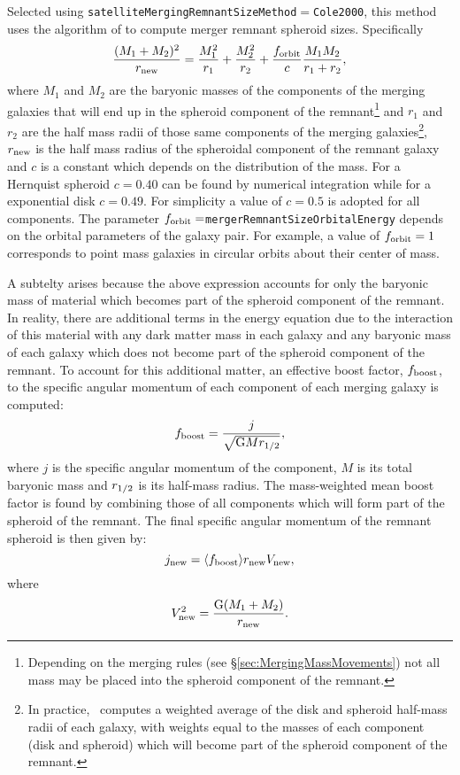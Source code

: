 Selected using {\tt satelliteMergingRemnantSizeMethod}$=${\tt Cole2000}, this method uses the algorithm of \cite{cole_hierarchical_2000} to compute merger remnant spheroid sizes. Specifically
\begin{equation}
\frac{(M_1+M_2)^2}{ r_{\rm new}} =
\frac{M_1^2}{r_1} + \frac{M_2^2}{r_2} + \frac{ f_{\rm orbit}}{c}
\frac{M_1 M_2}{r_1+r_2},
\end{equation}
where $M_1$ and $M_2$ are the baryonic masses of the components of the merging galaxies that will end up in the spheroid component of the remnant\footnote{Depending on the merging rules (see \S\protect\ref{sec:MergingMassMovements}) not all mass may be placed into the spheroid component of the remnant.} and $r_1$ and $r_2$ are the half mass radii of those same components of the merging galaxies\footnote{In practice, \glc\ computes a weighted average of the disk and spheroid half-mass radii of each galaxy, with weights equal to the masses of each component (disk and spheroid) which will become part of the spheroid component of the remnant.}, $r_{\rm new}$ is the half mass radius of the spheroidal component of the remnant galaxy and $c$ is a constant which depends on the distribution of the mass. For a Hernquist spheroid $c=0.40$ can be found by numerical integration while for a exponential disk $c=0.49$. For simplicity a value of $c=0.5$ is adopted for all components. The parameter $f_{\rm orbit}=${\tt mergerRemnantSizeOrbitalEnergy} depends on the orbital parameters of the galaxy pair. For example, a value of $f_{\rm orbit} = 1$ corresponds to point mass galaxies in circular orbits about their center of mass. 

A subtelty arises because the above expression accounts for only the baryonic mass of material which becomes part of the spheroid component of the remnant. In reality, there are additional terms in the energy equation due to the interaction of this material with any dark matter mass in each galaxy and any baryonic mass of each galaxy which does not become part of the spheroid component of the remnant. To account for this additional matter, an effective boost factor, $f_{\rm boost}$, to the specific angular momentum of each component of each merging galaxy is computed:
\begin{equation}
 f_{\rm boost} = {j \over \sqrt{{\rm G} M r_{1/2}}},
\end{equation}
where $j$ is the specific angular momentum of the component, $M$ is its total baryonic mass and $r_{\rm 1/2}$ is its half-mass radius. The mass-weighted mean boost factor is found by combining those of all components which will form part of the spheroid of the remnant. The final specific angular momentum of the remnant spheroid is then given by:
\begin{equation}
 j_{\rm new} = \langle f_{\rm boost} \rangle r_{\rm new} V_{\rm new},
\end{equation}
where
\begin{equation}
 V_{\rm new}^2 = {{\rm G} (M_1+M_2)\over r_{\rm new}}.
\end{equation}

